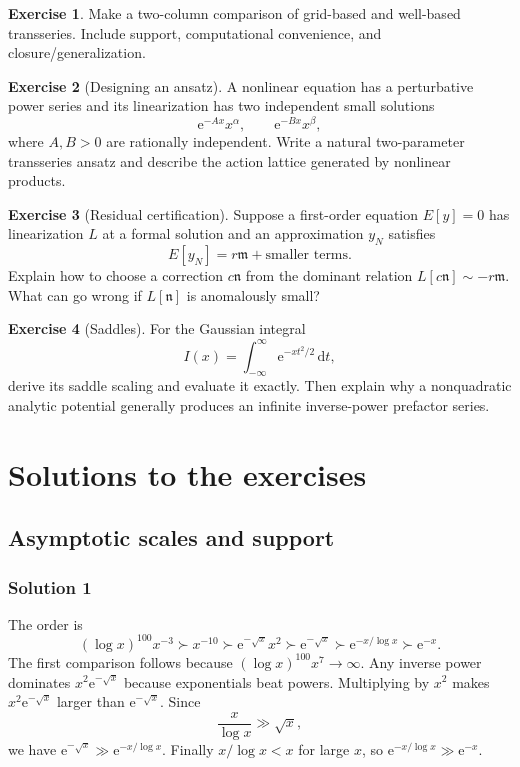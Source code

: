 \documentclass[11pt,openany]{book}
\theoremstyle{plain}
\theoremstyle{definition}
\newtheorem{exercise}{Exercise}[chapter]
\theoremstyle{remark}
\newcommand{\m}{\mathfrak{m}}
\newcommand{\n}{\mathfrak{n}}
\newcommand{\dd}{\,\mathrm{d}}
\newcommand{\e}{\mathrm{e}}
\begin{document}
\begin{exercise}
Make a two-column comparison of grid-based and well-based transseries. Include support, computational convenience, and closure/generalization.
\end{exercise}

\begin{exercise}[Designing an ansatz]
A nonlinear equation has a perturbative power series and its linearization has two independent small solutions
\[
  \e^{-Ax}x^\alpha,
  \qquad
  \e^{-Bx}x^\beta,
\]
where $A,B>0$ are rationally independent. Write a natural two-parameter transseries ansatz and describe the action lattice generated by nonlinear products.
\end{exercise}

\begin{exercise}[Residual certification]
Suppose a first-order equation $E[y]=0$ has linearization $L$ at a formal solution and an approximation $y_N$ satisfies
\[
  E[y_N]=r\m+\text{smaller terms}.
\]
Explain how to choose a correction $c\n$ from the dominant relation
$L[c\n]\sim-r\m$. What can go wrong if $L[\n]$ is anomalously small?
\end{exercise}

\begin{exercise}[Saddles]
For the Gaussian integral
\[
  I(x)=\int_{-\infty}^{\infty}\e^{-xt^2/2}\dd t,
\]
derive its saddle scaling and evaluate it exactly. Then explain why a nonquadratic analytic potential generally produces an infinite inverse-power prefactor series.
\end{exercise}

\chapter{Solutions to the exercises}
\label{chap:solutions}

\section{Asymptotic scales and support}

\subsection*{Solution 1}
The order is
\[
 (\log x)^{100}x^{-3}
 \succ x^{-10}
 \succ \e^{-\sqrt{x}}x^2
 \succ \e^{-\sqrt{x}}
 \succ \e^{-x/\log x}
 \succ \e^{-x}.
\]
The first comparison follows because $(\log x)^{100}x^7\to\infty$. Any inverse power dominates $x^2\e^{-\sqrt{x}}$ because exponentials beat powers. Multiplying by $x^2$ makes $x^2\e^{-\sqrt{x}}$ larger than $\e^{-\sqrt{x}}$. Since
\[
  \frac{x}{\log x}\gg\sqrt{x},
\]
we have $\e^{-\sqrt{x}}\gg\e^{-x/\log x}$. Finally $x/\log x<x$ for large $x$, so $\e^{-x/\log x}\gg\e^{-x}$.
\end{document}
